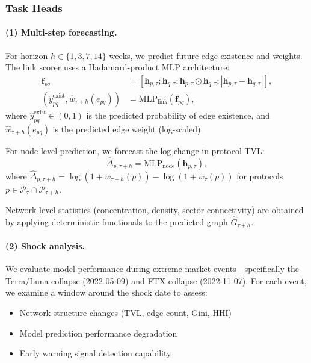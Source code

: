 \subsubsection{Task Heads}
\paragraph{(1) Multi-step forecasting.}
For horizon $h\in\{1,3,7,14\}$ weeks, we predict future edge existence and weights. The link scorer uses a Hadamard-product MLP architecture:
\begin{align}
\mathbf{f}_{pq} &= [\mathbf{h}_{p,\tau}; \mathbf{h}_{q,\tau}; \mathbf{h}_{p,\tau}\odot\mathbf{h}_{q,\tau}; |\mathbf{h}_{p,\tau}-\mathbf{h}_{q,\tau}|],\\
(\widehat{y}^{\mathrm{exist}}_{pq}, \widehat{w}_{\tau+h}(e_{pq})) &= \mathrm{MLP}_{\mathrm{link}}(\mathbf{f}_{pq}),
\end{align}
where $\widehat{y}^{\mathrm{exist}}_{pq}\in(0,1)$ is the predicted probability of edge existence, and $\widehat{w}_{\tau+h}(e_{pq})$ is the predicted edge weight (log-scaled).

For node-level prediction, we forecast the log-change in protocol TVL:
\begin{equation}
\widehat{\Delta}_{p,\tau+h} = \mathrm{MLP}_{\mathrm{node}}(\mathbf{h}_{p,\tau}),
\end{equation}
where $\widehat{\Delta}_{p,\tau+h} = \log(1+w_{\tau+h}(p)) - \log(1+w_{\tau}(p))$ for protocols $p\in\mathcal{P}_{\tau}\cap\mathcal{P}_{\tau+h}$.

Network-level statistics (concentration, density, sector connectivity) are obtained by applying deterministic functionals to the predicted graph $\widehat{G}_{\tau+h}$.

\paragraph{(2) Shock analysis.}
We evaluate model performance during extreme market events---specifically the Terra/Luna collapse (2022-05-09) and FTX collapse (2022-11-07). For each event, we examine a window around the shock date to assess:
\begin{itemize}
  \item Network structure changes (TVL, edge count, Gini, HHI)
  \item Model prediction performance degradation
  \item Early warning signal detection capability
\end{itemize}

